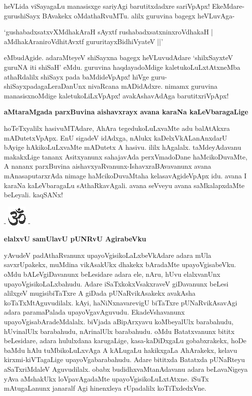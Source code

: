 \noindent
heVLida viSayagaLu manasisxge sariyAgi barutitxdadxre sariVpApx! EkeMdare- gurushiSayx BAvakekx oMdathaR\-vuMTu. alilx guruvina bagegx heVLuvAga-

\begin{shloka}
`gushabadxsatxvXMdhakAraH sAyxtf rushabadxsatxninxroVdhakaH |\\\label{190}
aMdhakAraniroVdhitAvxtf gururitayxBidhiVyateV ||'
\end{shloka}

\noindent
eMbudAgide. adaraMteyeV shiSayxna bagegx heVLuvudAdare `shilxSayxteV guruNA iti shiSaH'\label{190} eMdu. guru\-vina haqdayadoMdige kaletukoLuLxtAtxneMba athaRdalilx shiSayx pada baMdideVpApx! hiVge guru- shiSayxpada\-gaLeraDanUnx nivaRcana mADidAdxre. nimamx guruvina manasisxnoMdige kaletukoLiLxVpApx! avakAshavAdAga barutitxriVpApx!

{\bigskip
\noindent
{\large\bf aMtaraMgada parxBuvina aishavxrayx avana karaNa kaLeVbaragaLige}}\label{page190}
\medskip

\noindent
hoTeTxyalilx hasivuMTAdare, AhAra tegedukoLuLxvaMte adu balAtAkxra mADutetxVpApx. EnU sigadeV idAdxga, nAlukx kaDelxVkALanAnxdarU bAyige hAkikoLuLxvaMte mADutetx A hasivu. ililx hAga\-lalx. taMdeyAdavanu makakxLige tananx Asitxyanunx sahajavAda perxVmadoDane haMcikoDuvaMte, A nananx parxBuvina aishavxyaRvanunx-IshavxraBAvavanunx avana mAnasaputarxrAda nimage haMcikoDuvaMtaha kelasavA\-gideVpApx idu. avana I karaNa kaLeVbaragaLu sAthaRkavAgali. avana seVveyu avana saMkalapxdaMte beLeyali. kaqSANx!

\bigskip

\begin{center}
- \includegraphics{om.eps} -
\end{center}

{\bigskip
\noindent
{\large\bf elalxvU samUlavU pUNRvU AgirabeVku}}\label{page190}
\medskip

\noindent
yAvudeV padAthaRvanunx upayoVgisikoLaLxbeVkAdare adara mUla savxrUpakekx, muMdina vikA\-sakUkx dhakekx bAradaMte upayoVgisabeVku. oMdu bALeVgiDavanunx beLesidare adara ele, nAru, hUvu elalx\-vanUnx upayoVgisikoLaLxbahudu. Adare iSaTxkokxVsakxraveV giDavanunx beLesi alilxgeV mugisibiTaTxre A giDada pUNaRvikAsakekx avakAsha koTaTxMtAguvudilalx. kAyi, haNiNxnavarevigU biTaTxre pUNaRvikAsa\-vAgi adara paramaPalada upayoVgavAguvudu. EkadeVshavanunx upayoVgisabAradeMdalalx. biVjada aBipArxyavu koMbeyalUlx barabahudu, hUvinalUlx barabahudu, nArinalUlx barabahudu. oMdu Batatxvanunx bititx beLesidare, adara hululxdana karugaLige, kasa-kaDiDxgaLu gobabxrakekx, hoDe baMdu hAlu tuMbikoLuLxvAga A kALugaLu hakikxgaLa AhArakekx, kelavu kirxmi-kiVTagaLige upayoVgabarabahudu. Adare bititxda Batatxda pUNaRteyu aSaTxriMdaleV Aguvudilalx. obabx budidhxvaMtanAdavanu adara beLavaNigeya yAva aMshakUkx loVpavAgadaMte upayoVgisikoLuLxtAtxne. iSuTx mAtugaLanunx janaralf Agi hinenx\-leya rUpadalilx koTiTxdedxVne.

